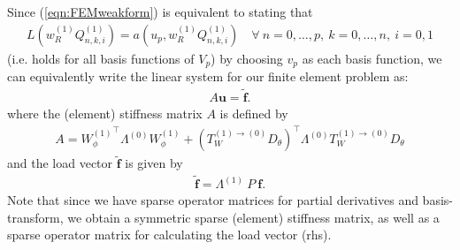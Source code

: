 \documentclass[11pt, oneside]{article}   	%
\newcommand{\genjac}{R}
\newcommand{\genjacw}{w_\genjac}
\newcommand{\scop}{Q}
\newcommand{\scopnki}{\scop_{n,k,i}}
\newcommand{\scopnkii}{\scopnki^{(1)}}
\begin{document}
Since (\ref{eqn:FEMweakform}) is equivalent to stating that
\begin{align*}
	L(\genjacw^{(1)} \scopnkii) = a(u_p, \genjacw^{(1)} \scopnkii) \quad \forall \: n = 0,\dots,p, \: k = 0,\dots,n, \: i = 0,1
\end{align*}
(i.e. holds for all basis functions of $V_p$) by choosing $v_p$ as each basis function, we can equivalently write the linear system for our finite element problem as:
\begin{align*}
	A\mathbf{u} = \tilde{\mathbf{f}}.
\end{align*}
where the (element) stiffness matrix $A$ is defined by 
\begin{align*}
	A =  {W_\phi^{(1)}}^\top \Lambda^{(0)}  W_\phi^{(1)} + ({T_W^{(1)\to(0)} D_\theta})^\top \Lambda^{(0)} T_W^{(1)\to(0)} D_\theta
\end{align*}
and the load vector $\tilde{\mathbf{f}}$ is given by 
\begin{align*}
	\tilde{\mathbf{f}} = \Lambda^{(1)} \: P \: \mathbf{f}.
\end{align*}
Note that since we have sparse operator matrices for partial derivatives and basis-transform, we obtain a symmetric sparse (element) stiffness matrix, as well as a sparse operator matrix for calculating the load vector (rhs).




\end{document}
